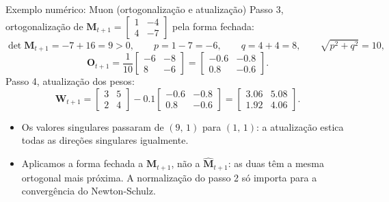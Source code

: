 \documentclass[aspectratio=169,xcolor=dvipsnames]{beamer}
\begin{document}
  \begin{frame}{Exemplo numérico: Muon (ortogonalização e atualização)}
    Passo 3, ortogonalização de $\mathbf{M}_{t+1}=\begin{bmatrix}1&-4\\4&-7\end{bmatrix}$ pela forma fechada:
    \[
      \det \mathbf{M}_{t+1}=-7+16=9>0,\qquad
      p=1-7=-6,\qquad q=4+4=8,\qquad \sqrt{p^{2}+q^{2}}=10,
    \]
    \[
      \mathbf{O}_{t+1}=\frac{1}{10}\begin{bmatrix}-6&-8\\8&-6\end{bmatrix}=\begin{bmatrix}-0.6&-0.8\\0.8&-0.6\end{bmatrix}.
    \]
    Passo 4, atualização dos pesos:
    \[
      \mathbf{W}_{t+1}=\begin{bmatrix}3&5\\2&4\end{bmatrix}-0.1\begin{bmatrix}-0.6&-0.8\\0.8&-0.6\end{bmatrix}
      =\begin{bmatrix}3.06&5.08\\1.92&4.06\end{bmatrix}.
    \]
    \begin{itemize}
      \item Os valores singulares passaram de $(9,\,1)$ para $(1,\,1)$: a atualização estica todas as direções singulares igualmente.
      \item Aplicamos a forma fechada a $\mathbf{M}_{t+1}$, não a $\widehat{\mathbf{M}}_{t+1}$: as duas têm a mesma
        ortogonal mais próxima. A normalização do passo 2 só importa para a convergência do Newton-Schulz.
    \end{itemize}
  \end{frame}
\end{document}
